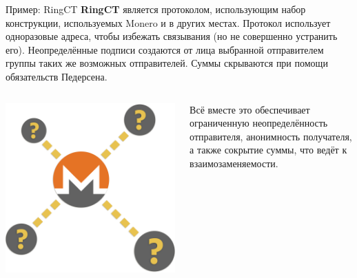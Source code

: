 \documentclass[aspectratio=169]{beamer}
\begin{document}
\begin{frame}{Пример: RingCT}
\textbf{RingCT} является протоколом, использующим набор конструкции, используемых Monero и в других местах. Протокол использует одноразовые адреса, чтобы избежать связывания (но не совершенно устранить его). Неопределённые подписи создаются от лица выбранной отправителем группы таких же возможных отправителей. Суммы скрываются при помощи обязательств Педерсена.

\begin{columns}
\begin{column}{0.2\textwidth}
\includegraphics[width=\textwidth]{ambiguous.png}
\end{column}
\begin{column}{0.8\textwidth}
Всё вместе это обеспечивает ограниченную неопределённость отправителя, анонимность получателя, а также сокрытие суммы, что ведёт к взаимозаменяемости.
\end{column}
\end{columns}
\end{frame}
\end{document}
